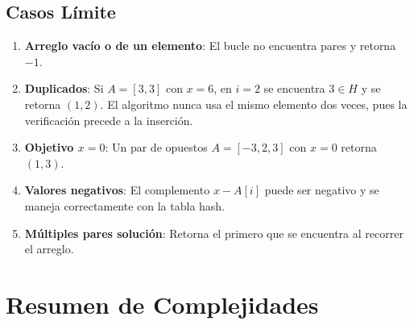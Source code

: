 \documentclass[11pt,a4paper]{article}
\begin{document}
\subsection{Casos Límite}
\begin{enumerate}
    \item \textbf{Arreglo vacío o de un elemento}: El bucle no encuentra pares y retorna $-1$.
    \item \textbf{Duplicados}: Si $A = [3, 3]$ con $x = 6$, en $i = 2$ se encuentra $3 \in H$ y se retorna $(1, 2)$. El algoritmo nunca usa el mismo elemento dos veces, pues la verificación precede a la inserción.
    \item \textbf{Objetivo $x = 0$}: Un par de opuestos $A = [-3, 2, 3]$ con $x = 0$ retorna $(1, 3)$.
    \item \textbf{Valores negativos}: El complemento $x - A[i]$ puede ser negativo y se maneja correctamente con la tabla hash.
    \item \textbf{Múltiples pares solución}: Retorna el primero que se encuentra al recorrer el arreglo.
\end{enumerate}

\newpage

\section{Resumen de Complejidades}
\end{document}

